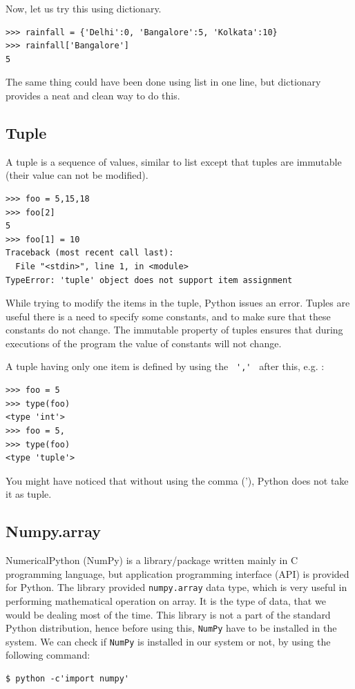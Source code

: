 \documentclass[10pt]{book}
\begin{document}
{Now, let us try this using dictionary. 
\beforeverb \begin{verbatim}
>>> rainfall = {'Delhi':0, 'Bangalore':5, 'Kolkata':10}
>>> rainfall['Bangalore']
5
\end{verbatim} \afterverb
The same thing could have been done using list in one line, but dictionary provides a neat and clean way to do this. 

\subsection{Tuple}
A tuple is a sequence of values, similar to list except that tuples are immutable (their value can not be modified).
\beforeverb \begin{verbatim}
>>> foo = 5,15,18
>>> foo[2]
5
>>> foo[1] = 10
Traceback (most recent call last):
  File "<stdin>", line 1, in <module>
TypeError: 'tuple' object does not support item assignment
\end{verbatim} \afterverb
While trying to modify the items in the tuple, Python issues an error. Tuples are useful there is a need to specify some constants, and to make sure that these constants do not change. The immutable property of tuples ensures that during executions of the program the value of constants will not change. 

A tuple having only one item is defined by using the \verb" ',' " after this, e.g. :
\beforeverb \begin{verbatim}
>>> foo = 5
>>> type(foo)
<type 'int'>
>>> foo = 5,
>>> type(foo)
<type 'tuple'>
\end{verbatim} \afterverb
You might have noticed that without using the comma ('), Python does not take it as tuple. 

\subsection{Numpy.array}
NumericalPython (NumPy) is a library/package written mainly in C programming language, but application programming interface (API) is provided for Python. The library provided \verb"numpy.array" data type, which is very useful in performing mathematical operation on array. It is the type of data, that we would be dealing most of the time. This library is not a part of the standard Python distribution, hence before using this, \verb"NumPy" have to be installed in the system. We can check if \verb"NumPy" is installed in our system or not, by using the following command:
\beforeverb \begin{verbatim}
$ python -c'import numpy'
\end{verbatim} \afterverb

}
\end{document}
